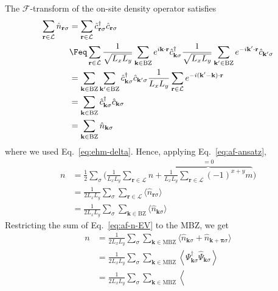 \begin{tabproof}
	The $\mathcal{F}$-transform of the on-site density operator satisfies
	\begin{align}
		\sum_{\mathbf{r}\in\mathcal{L}} \hat n_{\mathbf{r}\sigma} &= \sum_{\mathbf{r}\in\mathcal{L}} \hat c_{\mathbf{r}\sigma}^\dagger \hat c_{\mathbf{r}\sigma} \nonumber \\
		&\Feq \sum_{\mathbf{r}\in\mathcal{L}}
		\frac{1}{\sqrt{L_x L_y}} \sum_{\mathbf{k} \in \mathrm{BZ}} e^{i \mathbf{k} \cdot \mathbf{r}} \hat c_{\mathbf{k}\sigma}^\dagger \frac{1}{\sqrt{L_x L_y}} \sum_{\mathbf{k}' \in \mathrm{BZ}} e^{-i \mathbf{k}' \cdot \mathbf{r}} \hat c_{\mathbf{k}'\sigma} \nonumber \\
		&=\sum_{\mathbf{k} \in \mathrm{BZ}} \sum_{\mathbf{k}' \in \mathrm{BZ}} \hat c_{\mathbf{k}\sigma}^\dagger \hat c_{\mathbf{k}'\sigma} \frac{1}{L_x L_y} \sum_{\mathbf{r}\in\mathcal{L}} e^{-i (\mathbf{k}' - \mathbf{k}) \cdot \mathbf{r}} \nonumber \\
		&= \sum_{\mathbf{k} \in \mathrm{BZ}} \hat c_{\mathbf{k}\sigma}^\dagger \hat c_{\mathbf{k}\sigma} \nonumber \\
		&= \sum_{\mathbf{k} \in \mathrm{BZ}} \hat n_{\mathbf{k}\sigma} \label{eq:af-<n>-not0}
	\end{align}
	where we used Eq.~\eqref{eq:ehm-delta}. Hence, applying Eq.~\eqref{eq:af-ansatz},
	\begin{align}
		n &= \frac{1}{2} \sum_\sigma \Bigg(
		\frac{1}{L_x L_y} \sum_{\mathbf{r}\in\mathcal{L}} n + \overbrace{\frac{1}{L_x L_y} \sum_{\mathbf{r}\in\mathcal{L}} (-1)^{x+y} m}^{=0}
		\Bigg) \nonumber \\
		&= \frac{1}{2L_x L_y} \sum_\sigma \sum_{\mathbf{r}\in\mathcal{L}} \langle \hat n_{\mathbf{r}\sigma} \rangle \nonumber \\
		&= \frac{1}{2L_x L_y} \sum_\sigma \sum_{\mathbf{k} \in \mathrm{BZ}} \langle \hat n_{\mathbf{k}\sigma} \rangle \label{eq:af-n-EV}
	\end{align}
	Restricting the sum of Eq.~\eqref{eq:af-n-EV} to the MBZ, we get
	\[
	\begin{aligned}
		n &= \frac{1}{2L_x L_y} \sum_\sigma \sum_{\mathbf{k} \in \mathrm{MBZ}} \langle 
		\hat n_{\mathbf{k}\sigma} + \hat n_{\mathbf{k}+\bm{\pi}\sigma}
		\rangle \\
		&= \frac{1}{2L_x L_y} \sum_\sigma \sum_{\mathbf{k} \in \mathrm{MBZ}} \left\langle 
		\Psi_{\mathbf{k}\sigma}^\dagger \hat \Psi_{\mathbf{k}\sigma} 
		\right\rangle \\
		&= \frac{1}{2L_x L_y} \sum_\sigma \sum_{\mathbf{k} \in \mathrm{MBZ}} \left\langle 

\end{aligned}\]
\end{tabproof}
